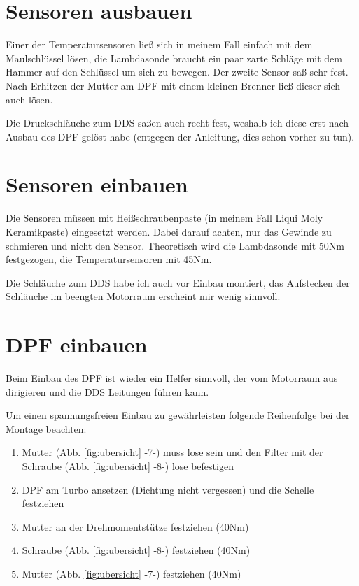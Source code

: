 \documentclass[twoside,a4paper]{refart}
\begin{document}
\section{Sensoren ausbauen}
Einer der Temperatursensoren ließ sich in meinem Fall einfach mit dem Maulschlüssel lösen, die Lambdasonde braucht ein paar zarte Schläge mit dem Hammer auf den Schlüssel um sich zu bewegen. Der zweite Sensor saß sehr fest. Nach Erhitzen der Mutter am DPF mit einem kleinen Brenner ließ dieser sich auch lösen.

Die Druckschläuche zum DDS saßen auch recht fest, weshalb ich diese erst nach Ausbau des DPF gelöst habe (entgegen der Anleitung, dies schon vorher zu tun).

\section{Sensoren einbauen}
Die Sensoren müssen mit Heißschraubenpaste (in meinem Fall Liqui Moly Keramikpaste) eingesetzt werden. Dabei darauf achten, nur das Gewinde zu schmieren und nicht den Sensor. Theoretisch wird die Lambdasonde mit 50Nm festgezogen, die Temperatursensoren mit 45Nm.

Die Schläuche zum DDS habe ich auch vor Einbau montiert, das Aufstecken der Schläuche im beengten Motorraum erscheint mir wenig sinnvoll.

\section{DPF einbauen}
Beim Einbau des DPF ist wieder ein Helfer sinnvoll, der vom Motorraum aus dirigieren und die DDS Leitungen führen kann.

Um einen spannungsfreien Einbau zu gewährleisten folgende Reihenfolge bei der Montage beachten:
\begin{enumerate}
	\item Mutter (Abb. \ref{fig:ubersicht} -7-) muss lose sein und den Filter mit der Schraube (Abb. \ref{fig:ubersicht} -8-) lose befestigen
	\item DPF am Turbo ansetzen (Dichtung nicht vergessen) und die Schelle festziehen
	\item Mutter an der Drehmomentstütze festziehen (40Nm)
	\item Schraube (Abb. \ref{fig:ubersicht} -8-) festziehen (40Nm)
	\item Mutter (Abb. \ref{fig:ubersicht} -7-) festziehen (40Nm)
\end{enumerate}
\end{document}
